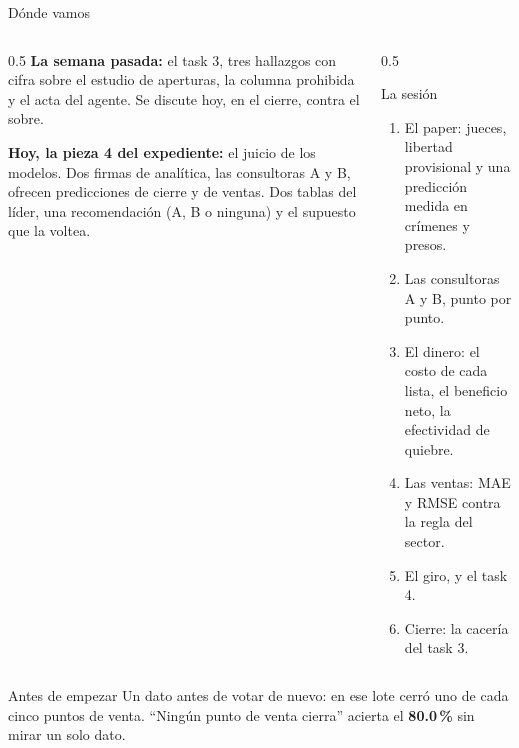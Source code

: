 \documentclass{beamer}
\begin{document}
\begin{frame}
\titlepage
\end{frame}

\begin{frame}{Dónde vamos}
\begin{columns}[T]
\begin{column}{0.5\textwidth}
\textbf{La semana pasada:} el task 3, tres hallazgos con cifra sobre el estudio de aperturas, la columna prohibida y el acta del agente. Se discute hoy, en el cierre, contra el sobre.

\medskip
\textbf{Hoy, la pieza 4 del expediente:} el juicio de los modelos. Dos firmas de analítica, las consultoras A y B, ofrecen predicciones de cierre y de ventas. Dos tablas del líder, una recomendación (A, B o ninguna) y el supuesto que la voltea.
\end{column}
\begin{column}{0.5\textwidth}
\begin{block}{La sesión}
\begin{enumerate}
  \item El paper: jueces, libertad provisional y una predicción medida en crímenes y presos.
  \item Las consultoras A y B, punto por punto.
  \item El dinero: el costo de cada lista, el beneficio neto, la efectividad de quiebre.
  \item Las ventas: MAE y RMSE contra la regla del sector.
  \item El giro, y el task 4.
  \item Cierre: la cacería del task 3.
\end{enumerate}
\end{block}
\end{column}
\end{columns}
\end{frame}

\begin{frame}{Antes de empezar}
\pause
\medskip
Un dato antes de votar de nuevo: en ese lote cerró uno de cada cinco puntos de venta. ``Ningún punto de venta cierra'' acierta el \textbf{80.0\,\%} sin mirar un solo dato.
\end{frame}
\end{document}
